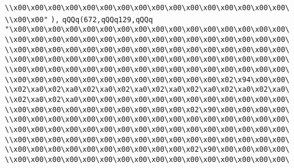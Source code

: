 \verb|\\x00\x00\x00\x00\x00\x00\x00\x00\x00\x00\x00\x00\x00\x00\x00\x00\|\newline
\verb|\\x00\x00"|\newline
\verb|),|\newline
\verb|qQQq(672,qQQq129,qQQq|\newline
\verb|"\x00\x00\x00\x00\x00\x00\x00\x00\x00\x00\x00\x00\x00\x00\x00\x00\|\newline
\verb|\\x00\x00\x00\x00\x00\x00\x00\x00\x00\x00\x00\x00\x00\x00\x00\x00\|\newline
\verb|\\x00\x00\x00\x00\x00\x00\x00\x00\x00\x00\x00\x00\x00\x00\x00\x00\|\newline
\verb|\\x00\x00\x00\x00\x00\x00\x00\x00\x00\x00\x00\x00\x00\x00\x00\x00\|\newline
\verb|\\x00\x00\x00\x00\x00\x00\x00\x00\x00\x00\x00\x00\x00\x00\x00\x00\|\newline
\verb|\\x00\x00\x00\x00\x00\x00\x00\x00\x00\x00\x00\x00\x02\x94\x00\x00\|\newline
\verb|\\x02\xa0\x02\xa0\x02\xa0\x02\xa0\x02\xa0\x02\xa0\x02\xa0\x02\xa0\|\newline
\verb|\\x02\xa0\x02\xa0\x00\x00\x00\x00\x00\x00\x00\x00\x00\x00\x00\x00\|\newline
\verb|\\x00\x00\x00\x00\x00\x00\x00\x00\x00\x00\x02\x90\x00\x00\x00\x00\|\newline
\verb|\\x00\x00\x00\x00\x00\x00\x00\x00\x00\x00\x00\x00\x00\x00\x00\x00\|\newline
\verb|\\x00\x00\x00\x00\x00\x00\x00\x00\x00\x00\x00\x00\x00\x00\x00\x00\|\newline
\verb|\\x00\x00\x00\x00\x00\x00\x00\x00\x00\x00\x00\x00\x00\x00\x00\x00\|\newline
\verb|\\x00\x00\x00\x00\x00\x00\x00\x00\x00\x00\x02\x90\x00\x00\x00\x00\|\newline
\verb|\\x00\x00\x00\x00\x00\x00\x00\x00\x00\x00\x00\x00\x00\x00\x00\x00\|\newline
